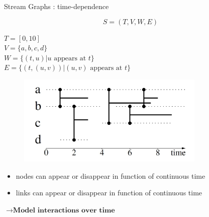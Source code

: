 \documentclass[15pt]{beamer}
\begin{document}
\begin{frame}{Stream Graphs : time-dependence}

\[
	S=(T,V,W,E)
\]
\medskip

\begin{minipage}{0.43\textwidth}
\begin{footnotesize}
$T=[0,10]$\\
$V=\{a,b,c,d\}$\\
$W = \{(t,u) | u \text{ appears at } t\}$\\
$E = \{(t,(u,v)) | (u,v) \text{ appears at } t\}$
\end{footnotesize}
\end{minipage}
\begin{minipage}[r]{0.55\textwidth}
\begin{figure}
    \flushright
    \includegraphics[width=0.8\textwidth]{img/exampleStream.JPG}
    \label{fig:exstream}
\end{figure}
\end{minipage}
\medskip

\begin{itemize}
    \item nodes can appear or disappear in function of continuous time
    \item links can appear or disappear in function of continuous time
\end{itemize}
\smallskip
\centering
$\rightarrow \textbf{Model interactions over time}$





\end{frame}
\end{document}
